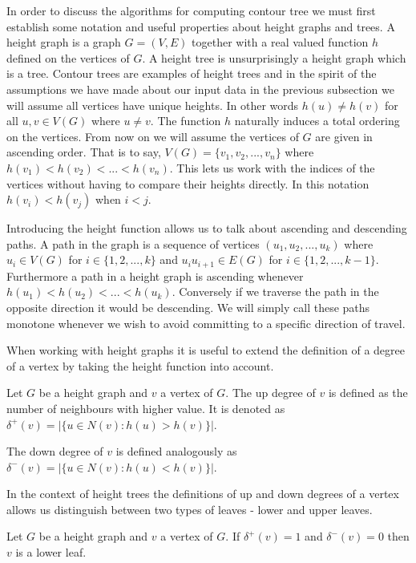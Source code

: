 In order to discuss the algorithms for computing contour tree we must first establish some notation and useful properties about height graphs and trees. A height graph is a graph $G = (V, E)$ together with a real valued function $h$ defined on the vertices of $G$. A height tree is unsurprisingly a height graph which is a tree. Contour trees are examples of height trees and in the spirit of the assumptions we have made about our input data in the previous subsection we will assume all vertices have unique heights. In other words $h(u) \ne h(v)$ for all $u ,v \in V(G)$ where $u \ne v$. The function $h$ naturally induces a total ordering on the vertices. From now on we will assume the vertices of $G$ are given in ascending order. That is to say, $V(G) = \{v_1, v_2, ... , v_n\}$ where $h(v_1) < h(v_2) < ... < h(v_n)$. This lets us work with the indices of the vertices without having to compare their heights directly. In this notation $h(v_i) < h(v_j)$ when $i < j$.


Introducing the height function allows us to talk about ascending and descending paths. A path in the graph is a sequence of vertices $(u_1, u_2, ... , u_k)$ where $u_i \in V(G)$ for $i \in \{1, 2, ..., k\}$ and $u_iu_{i+1} \in E(G)$ for $i \in \{1, 2, ..., k-1\}$. Furthermore a path in a height graph is ascending whenever $h(u_1) < h(u_2) < ... < h(u_k)$. Conversely if we traverse the path in the opposite direction it would be descending. We will simply call these paths monotone whenever we wish to avoid committing to a specific direction of travel.

When working with height graphs it is useful to extend the definition of a degree of a vertex by taking the height function into account.

\begin{defn} Let $G$ be a height graph and $v$ a vertex of $G$. The up degree of $v$ is defined as the number of neighbours with higher value. It is denoted as $\delta^+(v) = \big|\{ u \in N(v) : h(u) > h(v) \}\big|$.   \end{defn}

The down degree of $v$ is defined analogously as $\delta^-(v) = \big|\{ u \in N(v) : h(u) < h(v) \}\big|$. 

In the context of height trees the definitions of up and down degrees of a vertex allows us distinguish between two types of leaves - lower and upper leaves.

\begin{defn} Let $G$ be a height graph and $v$ a vertex of $G$. If  $\delta^+(v) = 1$ and $\delta^-(v) = 0$ then $v$ is a lower leaf.  \end{defn}

